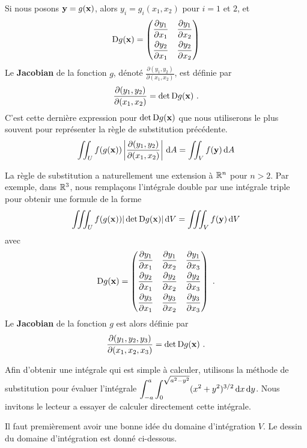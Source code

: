 {

Si nous posons $\mathbf{y} = g(\mathbf{x})$, alors $y_i = g_i(x_1,x_2)$ pour
$i=1$ et $2$, et
\[
\mathrm{D} g(\mathbf{x}) =
\begin{pmatrix}
  \displaystyle \frac{\partial y_1}{\partial x_1} & \displaystyle \frac{\partial y_1}{\partial x_2} \\[0.8em]
  \displaystyle \frac{\partial y_2}{\partial x_1} & \displaystyle \frac{\partial y_2}{\partial x_2}
\end{pmatrix}
\]
Le {\bfseries Jacobian} de la fonction $g$, dénoté
$\displaystyle \frac{\partial(y_1,y_2)}{\partial(x_1,x_2)}$, est
définie par
\[
    \frac{\partial(y_1,y_2)}{\partial(x_1,x_2)} = \det \mathrm{D} g(\mathbf{x}) \ .
\]
C'est cette dernière expression pour $\det \mathrm{D} g(\mathbf{x})$
que nous utiliserons le plus souvent pour représenter la règle de
substitution précédente.
\[
  \iint_{U} f(g(\mathbf{x})) \left|
    \frac{\partial(y_1,y_2)}{\partial(x_1,x_2)} \right|
  \,\mathrm{d}A = \iint_{V} f(\mathbf{y}) \,\mathrm{d}A
\]

La règle de substitution a naturellement une extension à $\mathbb{R}^n$ pour
$n>2$.  Par exemple, dans $\mathbb{R}^3$, nous remplaçons l'intégrale double
par une intégrale triple pour obtenir une formule de la forme
\[
  \iiint_{U} f(g(\mathbf{x})) |\det \mathrm{D} g(\mathbf{x})| \,\mathrm{d}V =
  \iiint_{V} f(\mathbf{y}) \,\mathrm{d}V
\]
avec
\[
\mathrm{D} g(\mathbf{x}) =
\begin{pmatrix}
  \displaystyle \frac{\partial y_1}{\partial x_1} & \displaystyle \frac{\partial y_1}{\partial x_2}
  & \displaystyle \frac{\partial y_1}{\partial x_3} \\[0.8em]
  \displaystyle \frac{\partial y_2}{\partial x_1} & \displaystyle \frac{\partial y_2}{\partial x_2}
  & \displaystyle \frac{\partial y_2}{\partial x_3} \\[0.8em]
  \displaystyle \frac{\partial y_3}{\partial x_1} & \displaystyle \frac{\partial y_3}{\partial x_2}
  & \displaystyle \frac{\partial y_3}{\partial x_3}
\end{pmatrix} \ .
\]
Le {\bfseries Jacobian} de la fonction $g$ est alors
définie par
\[
\frac{\partial(y_1,y_2,y_3)}{\partial(x_1,x_2,x_3)} = \det \mathrm{D} g(\mathbf{x}) \ .
\]

\begin{egg}
Afin d'obtenir une intégrale qui est simple à calculer, utilisons la
méthode de substitution pour évaluer l'intégrale
$\displaystyle \int_{-a}^a \int_0^{\sqrt{a^2-y^2}} (x^2 + y^2)^{3/2}
\,\mathrm{d}x \,\mathrm{d}y$.
Nous invitons le lecteur a essayer de calculer directement cette intégrale.

Il faut premièrement avoir une bonne idée du domaine d'intégration
$V$.  Le dessin du domaine d'intégration est donné ci-dessous.


\end{egg}}
